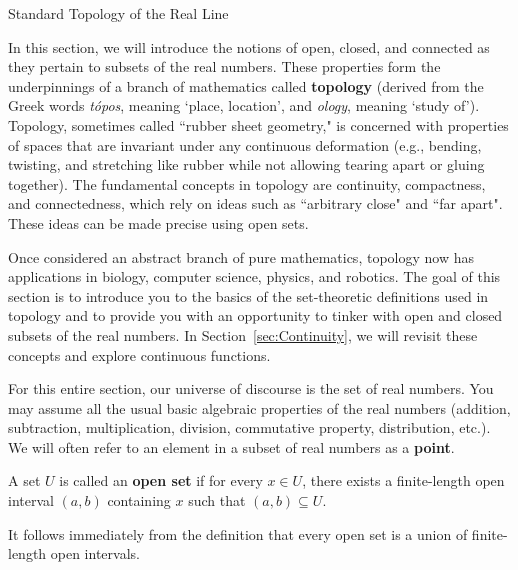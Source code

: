\begin{section}{Standard Topology of the Real Line}\label{sec:Topology}

In this section, we will introduce the notions of open, closed, and connected as they pertain to subsets of the real numbers.  These properties form the underpinnings of a branch of mathematics called \textbf{topology} (derived from the Greek words \emph{t\'opos}, meaning `place, location', and \emph{ology}, meaning `study of'). Topology, sometimes called ``rubber sheet geometry," is concerned with properties of spaces that are invariant under any continuous deformation (e.g., bending, twisting, and stretching like rubber while not allowing tearing apart or gluing together). The fundamental concepts in topology are continuity, compactness, and connectedness, which rely on ideas such as ``arbitrary close" and ``far apart". These ideas can be made precise using open sets.  

Once considered an abstract branch of pure mathematics, topology now has applications in biology, computer science, physics, and robotics. The goal of this section is to introduce you to the basics of the set-theoretic definitions used in topology and to provide you with an opportunity to tinker with open and closed subsets of the real numbers. In Section~\ref{sec:Continuity}, we will revisit these concepts and explore continuous functions.

For this entire section, our universe of discourse is the set of real numbers.  You may assume all the usual basic algebraic properties of the real numbers (addition, subtraction, multiplication, division, commutative property, distribution, etc.). We will often refer to an element in a subset of real numbers as a \textbf{point}.

\begin{definition}\label{def:open}
A set $U$ is called an \textbf{open set} if for every $x \in U$, there exists a finite-length open interval $(a,b)$ containing $x$ such that $(a,b)\subseteq U$.
\end{definition}

It follows immediately from the definition that every open set is a union of finite-length open intervals.


\end{section}
